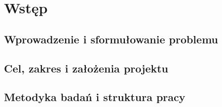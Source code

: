 \chapter{Wstęp}\label{ch:wstep}

\section{Wprowadzenie i sformułowanie problemu}\label{sec:wprowadzenie-problem}

\section{Cel, zakres i założenia projektu}\label{sec:cel-zakres-zalozenia}

\section{Metodyka badań i struktura pracy}\label{sec:metodyka-organizacja}
